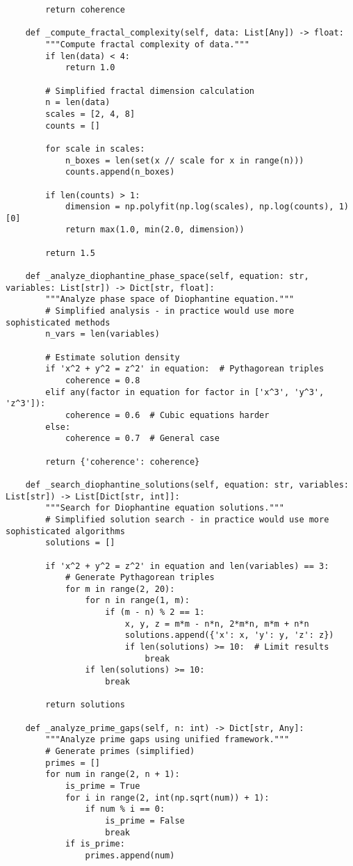 \documentclass[12pt]{article}
\begin{document}
\begin{lstlisting}
        return coherence

    def _compute_fractal_complexity(self, data: List[Any]) -> float:
        """Compute fractal complexity of data."""
        if len(data) < 4:
            return 1.0

        # Simplified fractal dimension calculation
        n = len(data)
        scales = [2, 4, 8]
        counts = []

        for scale in scales:
            n_boxes = len(set(x // scale for x in range(n)))
            counts.append(n_boxes)

        if len(counts) > 1:
            dimension = np.polyfit(np.log(scales), np.log(counts), 1)[0]
            return max(1.0, min(2.0, dimension))

        return 1.5

    def _analyze_diophantine_phase_space(self, equation: str, variables: List[str]) -> Dict[str, float]:
        """Analyze phase space of Diophantine equation."""
        # Simplified analysis - in practice would use more sophisticated methods
        n_vars = len(variables)

        # Estimate solution density
        if 'x^2 + y^2 = z^2' in equation:  # Pythagorean triples
            coherence = 0.8
        elif any(factor in equation for factor in ['x^3', 'y^3', 'z^3']):
            coherence = 0.6  # Cubic equations harder
        else:
            coherence = 0.7  # General case

        return {'coherence': coherence}

    def _search_diophantine_solutions(self, equation: str, variables: List[str]) -> List[Dict[str, int]]:
        """Search for Diophantine equation solutions."""
        # Simplified solution search - in practice would use more sophisticated algorithms
        solutions = []

        if 'x^2 + y^2 = z^2' in equation and len(variables) == 3:
            # Generate Pythagorean triples
            for m in range(2, 20):
                for n in range(1, m):
                    if (m - n) % 2 == 1:
                        x, y, z = m*m - n*n, 2*m*n, m*m + n*n
                        solutions.append({'x': x, 'y': y, 'z': z})
                        if len(solutions) >= 10:  # Limit results
                            break
                if len(solutions) >= 10:
                    break

        return solutions

    def _analyze_prime_gaps(self, n: int) -> Dict[str, Any]:
        """Analyze prime gaps using unified framework."""
        # Generate primes (simplified)
        primes = []
        for num in range(2, n + 1):
            is_prime = True
            for i in range(2, int(np.sqrt(num)) + 1):
                if num % i == 0:
                    is_prime = False
                    break
            if is_prime:
                primes.append(num)


\end{lstlisting}
\end{document}
